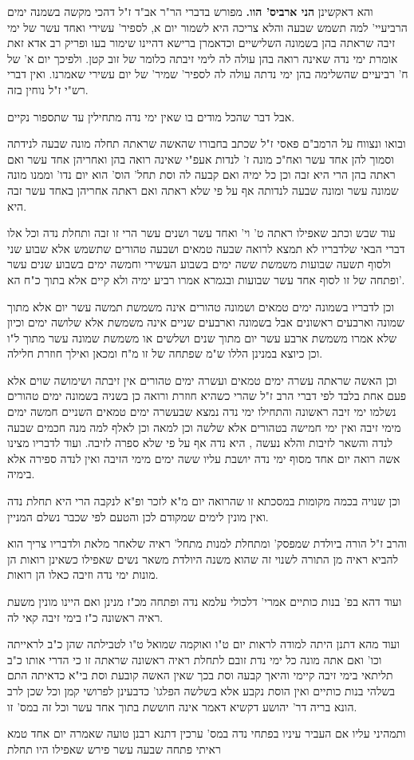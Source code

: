 \documentclass[12pt, openany]{book}
\begin{document}
{{והא דאקשינן \textbf{הני ארביס' הוו.} מפורש בדברי הר"ר אב"ד ז"ל דהכי מקשה בשמנה ימים הרביעיי' למה תשמש שבעה והלא צריכה היא לשמור יום א, לספיר' עשירי ואחד עשר של ימי זיבה שראתה בהן בשמונה השלישיים וכדאמרן ברישא דהיינו שימור בעו ופריק רב אדא זאת אומרת ימי נדה שאינה רואה בהן עולה לה לימי זיבתה כלומר של זוב קטן. ולפיכך יום א' של ח' רביעיים שהשלימה בהן ימי נדתה עולה לה לספיר' שמיר' של יום עשירי שאמרנו. ואין דברי רש"י ז"ל נוחין בזה.\par אבל דבר שהכל מודים בו שאין ימי נדה מתחילין עד שתספור נקיים.\par ובואו ונצווח על הרמב"ם פאסי ז"ל שכתב בחבורו שהאשה שראתה תחלה מונה שבעה לנידתה וסמוך להן אחד עשר ואח"כ מונה ז' לנדות אעפ"י שאינה רואה בהן ואחריהן אחד עשר ואם ראתה בהן הרי היא זבה וכן כל ימיה ואם קבעה לה וסת תחל' הוס' הוא יום נדו' וממנו מונה שמונה עשר ומונה שבעה לנדותה אף על פי שלא ראתה ואם ראתה אחריהן באחד עשר זבה היא.\par עוד שבש וכתב שאפילו ראתה ט' וי' ואחד עשר ושנים עשר הרי זו זבה ותחלת נדה וכל אלו דברי הבאי שלדבריו לא תמצא לרואה שבעה טמאים ושבעה טהורים שתשמש אלא שבוע שני ולסוף תשעה שבועות משמשת ששה ימים בשבוע העשירי וחמשה ימים בשבוע שנים עשר ופתחה של זו לסוף אחד עשר שבועות ובגמרא אמרו רביע ימיה ולא קיים אלא בתוך כ"ח הא'.\par וכן לדבריו בשמונה ימים טמאים ושמונה טהורים אינה משמשת תמשה עשר יום אלא מתוך שמונה וארבעים ראשונים אבל בשמונה וארבעים שניים אינה משמשת אלא שלושה ימים וכיון שלא אמרו משמשת ארבע עשר יום מתוך שנים ושלשים או משמשת שמונה עשר מתוך ל"ו וכן כיוצא במנינן הללו ש"מ שפתחה של זו מ"ח ומכאן ואילך חוזרת חלילה.\par וכן האשה שראתה עשרה ימים טמאים ועשרה ימים טהורים אין זיבתה ושימושה שוים אלא פעם אחת בלבד לפי דברי הרב ז"ל שהרי כשהיא חוזרת ורואה כן בשניה בשמונה ימים טהורים נשלמו ימי זיבה ראשונה והתחילו ימי נדה נמצא שבעשרה ימים טמאים השניים חמשה ימים מימי זיבה ואין ימי חמישה בטהורים אלא שלשה וכן למאה וכן לאלף למה מנה חכמים שבעה לנדה והשאר לזיבות והלא נעשה , היא נדה אף על פי שלא ספרה לזיבה. ועוד לדבריו מצינו אשה רואה יום אחד מסוף ימי נדה יושבת עליו ששה ימים מימי הזיבה ואין לנדה ספירה אלא בימיה.\par וכן שנויה בכמה מקומות במסכתא זו שהרואה יום מ"א לזכר ופ"א לנקבה הרי היא תחלת נדה ואין מונין לימים שמקודם לכן והטעם לפי שכבר נשלם המניין.\par והרב ז"ל הורה ביולדת שמפסק' ומתחלת למנות מתחל' ראיה שלאחר מלאת ולדבריו צריך הוא להביא ראיה מן התורה לשנוי זה שהוא משנה היולדת משאר נשים שאפילו כשאינן רואות הן מונות ימי נדה וזיבה כאלו הן רואות.\par ועוד דהא בפ' בנות כותיים אמרי' דלכולי עלמא נדה ופתחה מכ"ז מנינן ואם היינו מונין משעת ראיה ראשונה כ"ז בימי זיבה קאי לה.\par ועוד מהא דתנן היתה למודה לראות יום ט"ו ואוקמה שמואל ט"ו לטבילתה שהן כ"ב לראייתה וכו' ואם אתה מונה כל ימי נדת זובם לתחלת ראיה ראשונה שראתה זו כי הדרי אותו כ"ב תליתאי בימי זיבה קיימי והיאך קבעה וסת בכך שאין האשה קובעת וסת בי"א כדאיתה התם בשלהי בנות כותיים ואין הוסת נקבע אלא בשלשה הפלגו' כדבעינן לפרושי קמן וכל שכן לרב הונא בריה דר' יהושע דקשיא דאמר אינה חוששת בתוך אחד עשר וכל זה במס' זו.\par ותמהיני עליו אם העביר עיניו בפתחי נדה במס' ערכין דתנא רבנן טועה שאמרה יום אחד טמא ראיתי פתחה שבעה עשר פירש שאפילו היו תחלת }}
\end{document}
